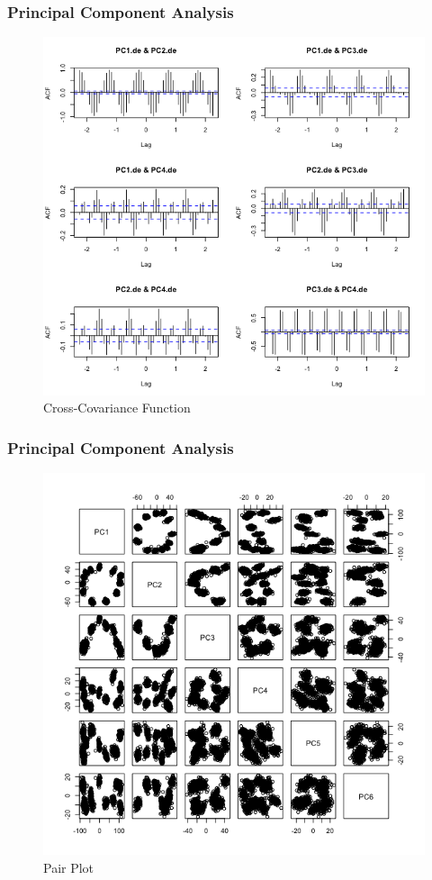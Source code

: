 \documentclass{beamer}
\begin{document}
\begin{frame}
\frametitle{Principal Component Analysis}
\begin{figure}
\centering
\includegraphics[width=0.7\linewidth]{../img/PCAde_CCF}
\caption{Cross-Covariance Function}
\label{fig:pcadpeccf}
\end{figure}
\end{frame}

\begin{frame}
\frametitle{Principal Component Analysis}
\begin{figure}
\centering
\includegraphics[width=0.7\linewidth]{../img/PCAde_pair}
\caption{Pair Plot}
\label{fig:pcade_pair}
\end{figure}
\end{frame}
\end{document}
